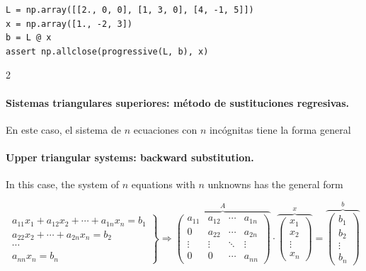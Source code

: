 \begin{verbatim}
L = np.array([[2., 0, 0], [1, 3, 0], [4, -1, 5]])
x = np.array([1., -2, 3])
b = L @ x
assert np.allclose(progressive(L, b), x)
\end{verbatim}

\begin{paracol}{2}
\paragraph{Sistemas triangulares superiores: método de sustituciones regresivas.} En este caso, el sistema de $n$ ecuaciones con $n$ incógnitas tiene la forma general
\switchcolumn
\paragraph{Upper triangular systems: backward substitution.} In this case, the system of $n$ equations with $n$ unknowns has the general form
\end{paracol}

\begin{equation*}
\left. \begin{aligned}
a_{11}x_1+a_{12}x_2+\cdots +a_{1n}x_n=b_1\\
a_{22}x_2+\cdots +a_{2n}x_n=b_2\\
\cdots  \\
a_{nn}x_n=b_n
\end{aligned}\right\} \Rightarrow	\overbrace{\begin{pmatrix}
a_{11}& a_{12}& \cdots & a_{1n}\\
0& a_{22}& \cdots & a_{2n}\\
\vdots & \vdots & \ddots & \vdots\\
0& 0& \cdots & a_{nn}
\end{pmatrix}}^A \cdot \overbrace{\begin{pmatrix}
x_1\\
x_2\\
\vdots \\
x_n
\end{pmatrix}}^x=\overbrace{\begin{pmatrix}
b_1\\
b_2\\
\vdots \\
b_n
\end{pmatrix}}^b
\end{equation*}

